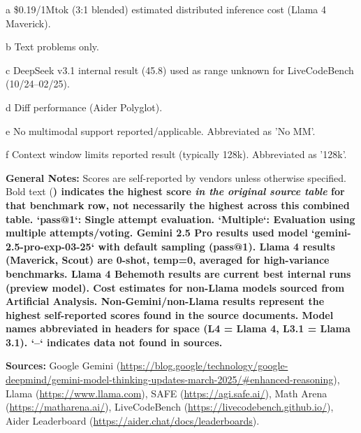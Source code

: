 \documentclass[11pt]{article}
\begin{document}
\begin{threeparttable}
    \vspace{1ex} %
    \begin{tablenotes}
        \sloppy %
        \footnotesize %
        \item[a] \$0.19/1Mtok (3:1 blended) estimated distributed inference cost (Llama 4 Maverick).
        \item[b] Text problems only.
        \item[c] DeepSeek v3.1 internal result (45.8) used as range unknown for LiveCodeBench (10/24--02/25).
        \item[d] Diff performance (Aider Polyglot).
        \item[e] No multimodal support reported/applicable. Abbreviated as 'No MM'.
        \item[f] Context window limits reported result (typically 128k). Abbreviated as '128k'.
        \item[] \textbf{General Notes:} Scores are self-reported by vendors unless otherwise specified. Bold text (\bfseries) indicates the highest score \textit{in the original source table} for that benchmark row, not necessarily the highest across this combined table. `pass@1`: Single attempt evaluation. `Multiple`: Evaluation using multiple attempts/voting. Gemini 2.5 Pro results used model `gemini-2.5-pro-exp-03-25` with default sampling (pass@1). Llama 4 results (Maverick, Scout) are 0-shot, temp=0, averaged for high-variance benchmarks. Llama 4 Behemoth results are current best internal runs (preview model). Cost estimates for non-Llama models sourced from Artificial Analysis. Non-Gemini/non-Llama results represent the highest self-reported scores found in the source documents. Model names abbreviated in headers for space (L4 = Llama 4, L3.1 = Llama 3.1). `--` indicates data not found in sources.
        \item[] \textbf{Sources:} Google Gemini (\url{https://blog.google/technology/google-deepmind/gemini-model-thinking-updates-march-2025/#enhanced-reasoning}), Llama (\url{https://www.llama.com}), SAFE (\url{https://agi.safe.ai/}), Math Arena (\url{https://matharena.ai/}), LiveCodeBench (\url{https://livecodebench.github.io/}), Aider Leaderboard (\url{https://aider.chat/docs/leaderboards}).
    \end{tablenotes}

\end{threeparttable}
\end{document}

